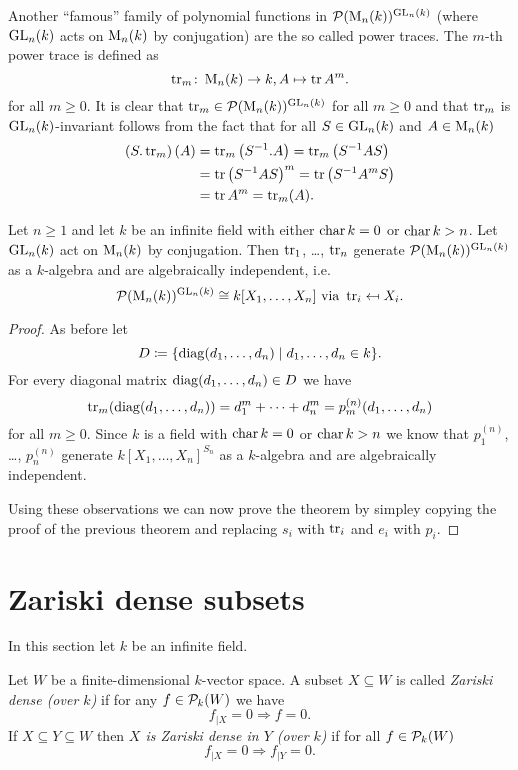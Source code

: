 Another ``famous'' family of polynomial functions in $\mathcal{P}(\operatorname{M}_n(k))^{\operatorname{GL}_n(k)}$ (where $\operatorname{GL}_n(k)$ acts on $\operatorname{M}_n(k)$ by conjugation) are the so called power traces. The $m$-th power trace is defined as
\[
 \operatorname{tr}_m \colon \operatorname{M}_n(k) \to k, A \mapsto \operatorname{tr} A^m.
\]
for all $m \geq 0$. It is clear that $\operatorname{tr}_m \in \mathcal{P}(\operatorname{M}_n(k))^{\operatorname{GL}_n(k)}$ for all $m \geq 0$ and that $\operatorname{tr}_m$ is $\operatorname{GL}_n(k)$-invariant follows from the fact that for all $S \in \operatorname{GL}_n(k)$ and $A \in \operatorname{M}_n(k)$
\begin{align*}
 \left(S.\operatorname{tr}_m\right)(A)
 &= \operatorname{tr}_m\left(S^{-1}.A\right)
 = \operatorname{tr}_m\left(S^{-1} A S\right) \\
 &= \operatorname{tr} \left(S^{-1} A S\right)^m
 = \operatorname{tr} \left(S^{-1} A^m S\right) \\
 &= \operatorname{tr} A^m
 = \operatorname{tr}_m(A).
\end{align*}


\begin{thrm}
 Let $n \geq 1$ and let $k$ be an infinite field with either $\operatorname{char} k = 0$ or $\operatorname{char} k > n$. Let $\operatorname{GL}_n(k)$ act on $\operatorname{M}_n(k)$ by conjugation. Then $\operatorname{tr}_1$, \dots, $\operatorname{tr}_n$ generate $\mathcal{P}(\operatorname{M}_n(k))^{\operatorname{GL}_n(k)}$ as a $k$-algebra and are algebraically independent, i.e.
 \[
  \mathcal{P}(\operatorname{M}_n(k))^{\operatorname{GL}_n(k)} \cong k[X_1, \dotsc, X_n] \text{ via } \operatorname{tr}_i \mapsfrom X_i.
 \]
\end{thrm}
\begin{proof}
 As before let 
 \[
  D \coloneqq \{\operatorname{diag}(d_1, \dotsc, d_n) \mid d_1, \dotsc, d_n \in k\}.
 \]
 For every diagonal matrix $\operatorname{diag}(d_1, \dotsc, d_n) \in D$ we have
 \[
  \operatorname{tr}_m(\operatorname{diag}(d_1, \dotsc, d_n)) = d_1^m + \dotsb + d_n^m = p^{(n)}_m(d_1, \dotsc, d_n)
 \]
 for all $m \geq 0$. Since $k$ is a field with $\operatorname{char} k = 0$ or $\operatorname{char} k > n$ we know that $p^{(n)}_1$, \dots, $p^{(n)}_n$ generate $k[X_1, \dotsc, X_n]^{S_n}$ as a $k$-algebra and are algebraically independent.
 
 Using these observations we can now prove the theorem by simpley copying the proof of the previous theorem and replacing $s_i$ with $\operatorname{tr}_i$ and $e_i$ with $p_i$.
\end{proof}





\section{Zariski dense subsets}
In this section let $k$ be an infinite field.


\begin{defi}
 Let $W$ be a finite-dimensional $k$-vector space. A subset $X \subseteq W$ is called \emph{Zariski dense (over $k$)} if for any $f \in \mathcal{P}_k(W)$ we have
 \[
  f_{|X} = 0 \Rightarrow f = 0.
 \]
 If $X \subseteq Y \subseteq W$ then \emph{$X$ is Zariski dense in $Y$ (over $k$)} if for all $f \in \mathcal{P}_k(W)$
 \[
  f_{|X} = 0 \Rightarrow f_{|Y} = 0.
 \]
\end{defi}


